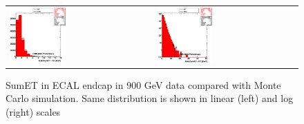\begin{figure}[h!]
 \centering
 \begin{tabular}{ll}
  \includegraphics[width=0.40\textwidth]{plots_DataVsMC_MB_900GeV/h_caloSumetEE_lin.eps} &
  \includegraphics[width=0.40\textwidth]{plots_DataVsMC_MB_900GeV/h_caloSumetEE.eps} \\
 \end{tabular}
\caption{SumET in ECAL endcap in 900 GeV data compared
   with Monte Carlo simulation. Same distribution is shown in linear (left) and log (right) scales
          \label{fig:DataVsMC_MB_900_6}}
\end{figure}

